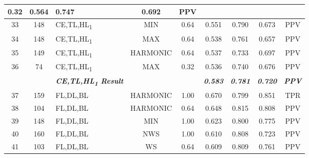 \begin{table}[H]
{\begin{tabular}{cc|l|cc|c|c|c|c|}
    0.32 &
    0.564 &
    0.747 &
    0.692 &
    PPV \\ \hline
  \multicolumn{1}{|c|}{33} &
    148 &
    CE,TL,HL\textsubscript{1} &
    \multicolumn{1}{c|}{MIN} &
    0.64 &
    0.551 &
    0.790 &
    0.673 &
    PPV \\ \hline
  \multicolumn{1}{|c|}{34} &
    148 &
    CE,TL,HL\textsubscript{1} &
    \multicolumn{1}{c|}{MAX} &
    0.64 &
    0.538 &
    0.761 &
    0.657 &
    PPV \\ \hline
  \multicolumn{1}{|c|}{35} &
    149 &
    CE,TL,HL\textsubscript{1} &
    \multicolumn{1}{c|}{HARMONIC} &
    0.64 &
    0.537 &
    0.733 &
    0.697 &
    PPV \\ \hline
  \multicolumn{1}{|c|}{36} &
    74 &
    CE,TL,HL\textsubscript{1} &
    \multicolumn{1}{c|}{MAX} &
    0.32 &
    0.536 &
    0.740 &
    0.676 &
    PPV \\ \hline
   &
     &
    \textit{\textbf{CE,TL,HL\textsubscript{1} Result}} &
     &
     &
    \textit{\textbf{0.583}} &
    \textit{\textbf{0.781}} &
    \textit{\textbf{0.720}} &
    \textit{\textbf{PPV}} \\ \hline
  \multicolumn{1}{|c|}{37} &
    159 &
    FL,DL,BL &
    \multicolumn{1}{c|}{HARMONIC} &
    1.00 &
    0.670 &
    0.799 &
    0.851 &
    TPR \\ \hline
  \multicolumn{1}{|c|}{38} &
    104 &
    FL,DL,BL &
    \multicolumn{1}{c|}{HARMONIC} &
    0.64 &
    0.648 &
    0.815 &
    0.808 &
    PPV \\ \hline
  \multicolumn{1}{|c|}{39} &
    148 &
    FL,DL,BL &
    \multicolumn{1}{c|}{MIN} &
    1.00 &
    0.623 &
    0.800 &
    0.775 &
    PPV \\ \hline
  \multicolumn{1}{|c|}{40} &
    160 &
    FL,DL,BL &
    \multicolumn{1}{c|}{NWS} &
    1.00 &
    0.610 &
    0.808 &
    0.723 &
    PPV \\ \hline
  \multicolumn{1}{|c|}{41} &
    103 &
    FL,DL,BL &
    \multicolumn{1}{c|}{WS} &
    0.64 &
    0.609 &
    0.809 &
    0.761 &
    PPV \\ \hline
  \end{tabular}%
  }
  \end{table}

